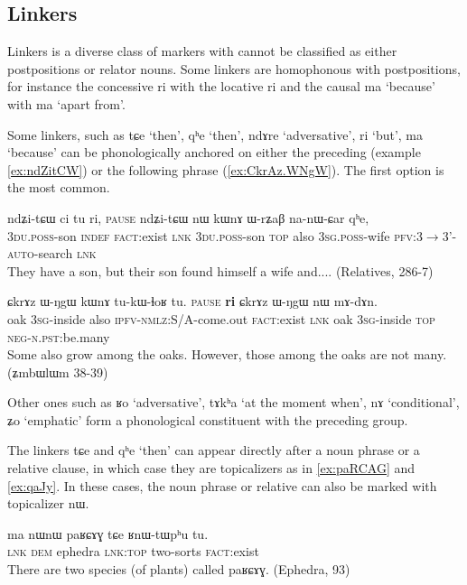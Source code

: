 \documentclass[oldfontcommands,oneside,a4paper,11pt]{article}
\newcommand{\ipa}[1]{{\phon \mbox{#1}}} %
\begin{document}
\subsection{Linkers} \label{sec:linkers}
Linkers is a diverse class of markers with cannot be classified as either postpositions or relator nouns.   Some linkers are homophonous with postpositions, for instance the concessive \ipa{ri} with the locative \ipa{ri} and the causal \ipa{ma} `because' with \ipa{ma} `apart from'.

Some linkers, such as    \ipa{tɕe}  `then', \ipa{qʰe} `then', \ipa{ndɤre} `adversative', \ipa{ri} `but', \ipa{ma}  `because' can be phonologically anchored on either the preceding (example \ref{ex:ndZitCW}) or the following phrase (\ref{ex:CkrAz.WNgW}). The first option is the most common.  
 \begin{exe}
\ex \label{ex:ndZitCW} 
\gll
\ipa{ndʑi-tɕɯ}   	\ipa{ci}   	\ipa{tu}   	\ipa{ri,}  \textsc{pause} 	\ipa{ndʑi-tɕɯ}   	\ipa{nɯ}   	\ipa{kɯnɤ}   	\ipa{ɯ-rʑaβ}   	\ipa{na-nɯ-ɕar}   	\ipa{qʰe,}   \\
\textsc{3du.poss}-son \textsc{indef} \textsc{fact}:exist \textsc{lnk} {  } \textsc{3du.poss}-son  \textsc{top} also \textsc{3sg.poss}-wife \textsc{pfv}:3$\rightarrow$3'-\textsc{auto}-search \textsc{lnk} \\
\glt They have a son, but their son found himself a wife and.... (Relatives, 286-7)
\end{exe}
 \begin{exe}
\ex \label{ex:CkrAz.WNgW} 
\gll
\ipa{ɕkrɤz}   	\ipa{ɯ-ŋgɯ}   	\ipa{kɯnɤ}   	\ipa{tu-kɯ-ɬoʁ}   	\ipa{tu.}   \textsc{pause}	\ipa{\textbf{ri}}   	\ipa{ɕkrɤz}   	\ipa{ɯ-ŋgɯ}   	\ipa{nɯ}   	\ipa{mɤ-dɤn.}   \\
oak \textsc{3sg}-inside  also \textsc{ipfv-nmlz}:S/A-come.out \textsc{fact}:exist {  } \textsc{lnk} oak \textsc{3sg}-inside \textsc{top} \textsc{neg-n.pst}:be.many \\
\glt Some also grow among the oaks. However, those among the oaks are not many. (ʑmbɯlɯm 38-39)
\end{exe}

Other ones such as \ipa{ʁo} `adversative', \ipa{tɤkʰa} `at the moment when', \ipa{nɤ} `conditional', \ipa{ʑo} `emphatic' form a phonological constituent with the preceding group.

The linkers   \ipa{tɕe} and \ipa{qʰe} `then'  can appear directly after a noun phrase or a relative clause, in which case they are topicalizers as in \ref{ex:paRCAG} and \ref{ex:qaJy}. In these cases, the noun phrase or relative can also be marked with topicalizer \ipa{nɯ}.
 \begin{exe}
\ex \label{ex:paRCAG} 
\gll
\ipa{ma}   	\ipa{nɯnɯ}   	\ipa{paʁɕɤɣ}   	\ipa{tɕe}   	\ipa{ʁnɯ-tɯpʰu}   	\ipa{tu.}   \\
\textsc{lnk} \textsc{dem} ephedra \textsc{lnk:top} two-sorts \textsc{fact}:exist \\
\glt There are two species (of plants) called \ipa{paʁɕɤɣ}. (Ephedra, 93)
\end{exe}
\end{document}
